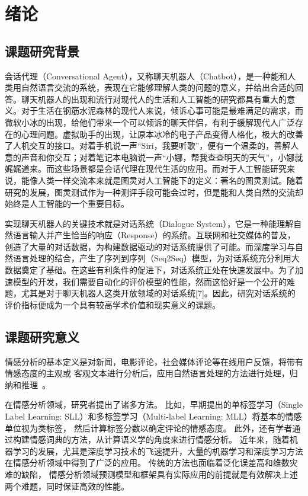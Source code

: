 
\chapter{绪论}\label{ch:绪论}

\section{课题研究背景}
会话代理（Conversational Agent），又称聊天机器人（Chatbot），是一种能和人类用自然语言交流的系统，表现在它能够理解人类的问题的意义，并给出合适的回答。聊天机器人的出现和流行对现代人的生活和人工智能的研究都具有重大的意义。对于生活在钢筋水泥森林的现代人来说，倾诉心事可能是最难满足的需求，而微软小冰的出现，给他们带来一个可以倾诉的聊天伴侣，有利于缓解现代人广泛存在的心理问题。虚拟助手的出现，让原本冰冷的电子产品变得人格化，极大的改善了人机交互的接口。对着手机说一声“Siri，我要听歌”，便有一个温柔的，善解人意的声音和你交互；对着笔记本电脑说一声“小娜，帮我查查明天的天气”，小娜就娓娓道来。而这些场景都是会话代理在现代生活的应用。而对于人工智能研究来说，能像人类一样交流本来就是图灵对人工智能下的定义：著名的图灵测试。随着研究的发展，图灵测试作为一种测评手段可能会过时，但是能和人类自然的交流却始终是人工智能的一个重要目标。

实现聊天机器人的关键技术就是对话系统（Dialogue System），它是一种能理解自然语言输入并产生恰当的响应（Response）的系统。互联网和社交媒体的普及，创造了大量的对话数据，为构建数据驱动的对话系统提供了可能。而深度学习与自然语言处理的结合，产生了序列到序列（Seq2Seq）模型，为对话系统充分利用大数据奠定了基础。在这些有利条件的促进下，对话系统正处在快速发展中。为了加速模型的开发，我们需要自动化的评价模型的性能，然而这恰好是一个公开的难题，尤其是对于聊天机器人这类开放领域的对话系统[7]。因此，研究对话系统的评价指标便成为一个具有较高学术价值和现实意义的课题。

\section{课题研究意义}
情感分析的基本定义是对新闻，电影评论，社会媒体评论等在线用户反馈，将带有情感态度的主观或
客观文本进行分析后，应用自然语言处理的方法进行处理，归纳和推理~。

在情感分析领域，研究者提出了诸多方法。
比如，早期提出的单标签学习（Single Label Learning: SLL）和多标签学习（Multi-label Learning: MLL）将基本的情感单位视为类标签，
然后计算标签分数以确定评论的情感态度。
此外，还有学者通过构建情感词典的方法，从计算语义学的角度来进行情感分析。
近年来，随着机器学习的发展，尤其是深度学习技术的飞速提升，大量的机器学习和深度学习方法在情感分析领域中得到了广泛的应用。
传统的方法也面临着泛化误差高和维数灾难的缺陷，
情感分析领域预测模型和框架具有实际应用的前提就是有效解决上述两个难题，同时保证高效的性能。

